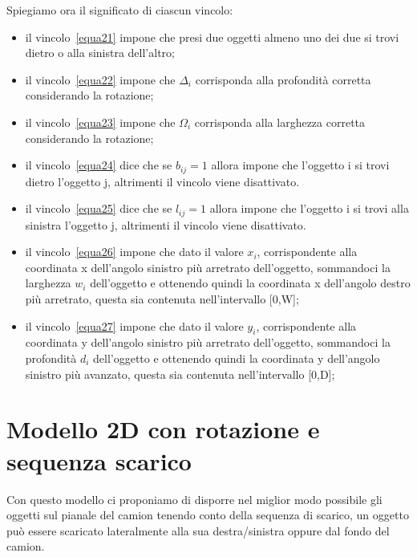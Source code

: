 Spiegiamo ora il significato di ciascun vincolo:
\begin{itemize}
	\item il vincolo~\eqref{equa21} impone che presi due oggetti almeno uno dei due si trovi dietro o alla sinistra dell'altro;
	\item il vincolo~\eqref{equa22} impone che $\Delta_i$ corrisponda alla profondità corretta considerando la rotazione;
	\item il vincolo~\eqref{equa23} impone che $\Omega_i$ corrisponda alla larghezza corretta considerando la rotazione;
	\item il vincolo~\eqref{equa24} dice che se $b_{ij} = 1$ allora impone che l'oggetto i si trovi dietro l'oggetto j, altrimenti il vincolo viene disattivato.
	\item il vincolo~\eqref{equa25} dice che se $l_{ij} = 1$ allora impone che l'oggetto i si trovi alla sinistra l'oggetto j, altrimenti il vincolo viene disattivato. 
	\item il vincolo~\eqref{equa26} impone che dato il valore $x_i$, corrispondente alla coordinata x dell'angolo sinistro più arretrato dell'oggetto, sommandoci la larghezza $w_i$ dell'oggetto e ottenendo quindi la coordinata x dell'angolo destro più arretrato, questa sia contenuta nell'intervallo [0,W];
	\item il vincolo~\eqref{equa27} impone che dato il valore $y_i$, corrispondente alla coordinata y dell'angolo sinistro più arretrato dell'oggetto, sommandoci la profondità $d_i$ dell'oggetto e ottenendo quindi la coordinata y dell'angolo sinistro più avanzato, questa sia contenuta nell'intervallo [0,D];
\end{itemize}

\section{Modello 2D con rotazione e sequenza scarico}
Con questo modello ci proponiamo di disporre nel miglior modo possibile gli oggetti sul pianale del camion tenendo conto della sequenza di scarico, un oggetto può essere scaricato lateralmente alla sua destra/sinistra oppure dal fondo del camion.

